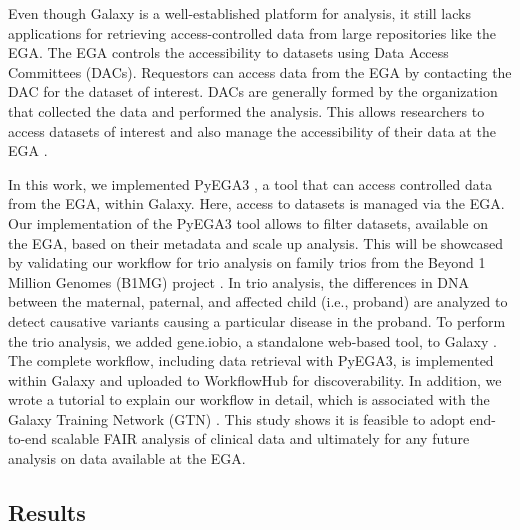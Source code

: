 Even though Galaxy is a well-established platform for analysis, it still lacks applications for retrieving access-controlled data from large repositories like the EGA. The EGA controls the accessibility to datasets using Data Access Committees (DACs). Requestors can access data from the EGA by contacting the DAC for the dataset of interest. DACs are generally formed by the organization that collected the data and performed the analysis. This allows researchers to access datasets of interest and also manage the accessibility of their data at the EGA \cite{DAC}.

In this work, we implemented PyEGA3 \cite{EGA}, a tool that can access controlled data from the EGA, within Galaxy. Here, access to datasets is managed via the EGA. Our implementation of the PyEGA3 tool allows to filter datasets, available on the EGA, based on their metadata and scale up analysis. This will be showcased by validating our workflow for trio analysis on family trios from the Beyond 1 Million Genomes (B1MG) project \cite{B1MG}. In trio analysis, the differences in DNA between the maternal, paternal, and affected child (i.e., proband) are analyzed to detect causative variants causing a particular disease in the proband. To perform the trio analysis, we added gene.iobio, a standalone web-based tool, to Galaxy \cite{geneiobio}. The complete workflow, including data retrieval with PyEGA3, is implemented within Galaxy and uploaded to WorkflowHub for discoverability. In addition, we wrote a tutorial to explain our workflow in detail, which is associated with the Galaxy Training Network (GTN) \cite{GTN}. This study shows it is feasible to adopt end-to-end scalable FAIR analysis of clinical data and ultimately for any future analysis on data available at the EGA.

\subsection*{Results}

